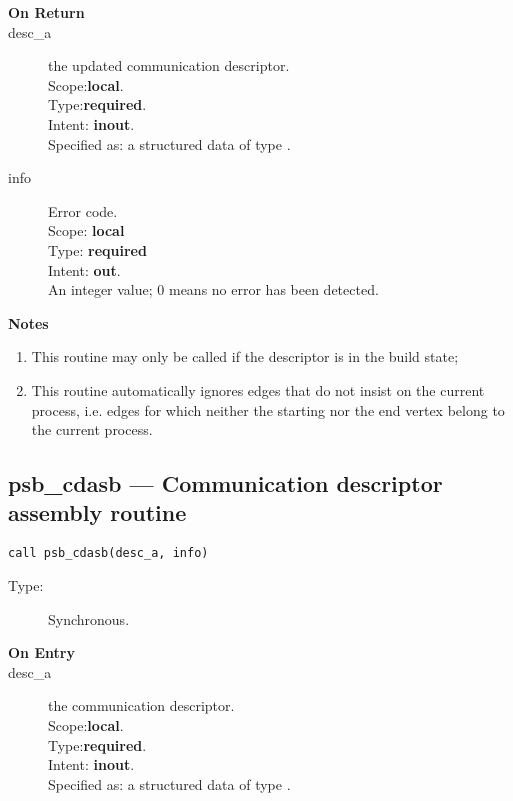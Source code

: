 \begin{description}
\item[\bf On Return]
\item[desc\_a] the updated communication descriptor.\\
Scope:{\bf local}.\\
Type:{\bf required}.\\
Intent: {\bf inout}.\\
Specified as: a structured data of type \descdata.
\item[info] Error code.\\
Scope: {\bf local} \\
Type: {\bf required} \\
Intent: {\bf out}.\\
An integer value; 0 means no error has been detected. 
\end{description}
{\par\noindent\large\bfseries Notes}
\begin{enumerate}
\item This routine may only be called if the descriptor is in the
  build state;
\item  This routine automatically ignores edges that do not
insist on the  current process, i.e. edges for which neither the starting
nor the end vertex belong to the current process. 
\end{enumerate}



%
%
\clearpage\subsection*{psb\_cdasb --- Communication descriptor assembly routine}

\begin{verbatim}
call psb_cdasb(desc_a, info)
\end{verbatim}

\begin{description}
\item[Type:] Synchronous.
\item[\bf On Entry]
\item[desc\_a] the communication descriptor.\\
Scope:{\bf local}.\\
Type:{\bf required}.\\
Intent: {\bf inout}.\\
Specified as: a structured data of type \descdata.
\end{description}

